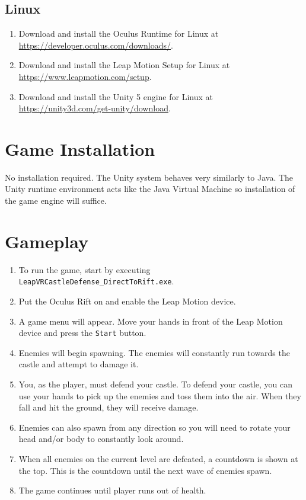 \documentclass[a4paper]{refart}
\begin{document}
\subsection{Linux}

\begin{enumerate}
	\item Download and install the Oculus Runtime for Linux at\\ \url{https://developer.oculus.com/downloads/}.
	\item Download and install the Leap Motion Setup for Linux at\\ \url{https://www.leapmotion.com/setup}.
	\item Download and install the Unity 5 engine for Linux at\\ \url{https://unity3d.com/get-unity/download}.
\end{enumerate}

\pagebreak

\section{Game Installation}

No installation required. The Unity system behaves very similarly to Java. The Unity runtime environment acts like the Java Virtual Machine so installation of the game engine will suffice.

\section{Gameplay}

\begin{enumerate}
	\item To run the game, start by executing \texttt{LeapVRCastleDefense\_DirectToRift.exe}.
	\item Put the Oculus Rift on and enable the Leap Motion device.
	\item A game menu will appear. Move your hands in front of the Leap Motion device and press the \texttt{Start} button.
	\item Enemies will begin spawning. The enemies will constantly run towards the castle and attempt to damage it. 
	\item You, as the player, must defend your castle. To defend your castle, you can use your hands to pick up the enemies and toss them into the air. When they fall and hit the ground, they will receive damage. 
	\item Enemies can also spawn from any direction so you will need to rotate your head and/or body to constantly look around.
	\item When all enemies on the current level are defeated, a countdown is shown at the top. This is the countdown until the next wave of enemies spawn. 
	\item The game continues until player runs out of health.
\end{enumerate}
\end{document}
